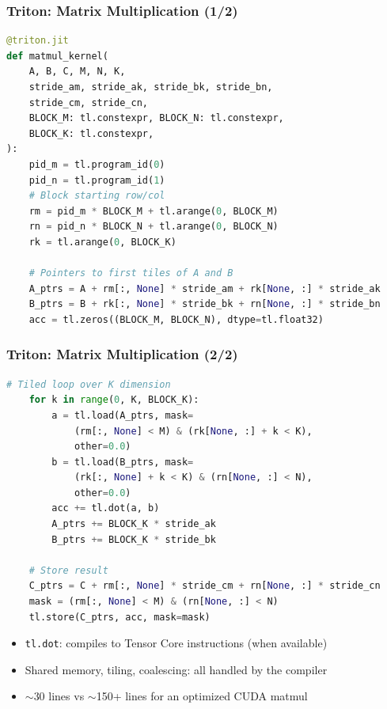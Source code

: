 \documentclass[aspectratio=169]{beamer}
\begin{document}
\begin{frame}[fragile]
	\frametitle{Triton: Matrix Multiplication (1/2)}
	\begin{lstlisting}[language=Python]
@triton.jit
def matmul_kernel(
    A, B, C, M, N, K,
    stride_am, stride_ak, stride_bk, stride_bn,
    stride_cm, stride_cn,
    BLOCK_M: tl.constexpr, BLOCK_N: tl.constexpr,
    BLOCK_K: tl.constexpr,
):
    pid_m = tl.program_id(0)
    pid_n = tl.program_id(1)
    # Block starting row/col
    rm = pid_m * BLOCK_M + tl.arange(0, BLOCK_M)
    rn = pid_n * BLOCK_N + tl.arange(0, BLOCK_N)
    rk = tl.arange(0, BLOCK_K)

    # Pointers to first tiles of A and B
    A_ptrs = A + rm[:, None] * stride_am + rk[None, :] * stride_ak
    B_ptrs = B + rk[:, None] * stride_bk + rn[None, :] * stride_bn
    acc = tl.zeros((BLOCK_M, BLOCK_N), dtype=tl.float32)
	\end{lstlisting}
\end{frame}

\begin{frame}[fragile]
	\frametitle{Triton: Matrix Multiplication (2/2)}
	\begin{lstlisting}[language=Python]
    # Tiled loop over K dimension
    for k in range(0, K, BLOCK_K):
        a = tl.load(A_ptrs, mask=
            (rm[:, None] < M) & (rk[None, :] + k < K),
            other=0.0)
        b = tl.load(B_ptrs, mask=
            (rk[:, None] + k < K) & (rn[None, :] < N),
            other=0.0)
        acc += tl.dot(a, b)
        A_ptrs += BLOCK_K * stride_ak
        B_ptrs += BLOCK_K * stride_bk

    # Store result
    C_ptrs = C + rm[:, None] * stride_cm + rn[None, :] * stride_cn
    mask = (rm[:, None] < M) & (rn[None, :] < N)
    tl.store(C_ptrs, acc, mask=mask)
	\end{lstlisting}
	\vspace{0.3em}
	\begin{itemize}
		\item \texttt{tl.dot}: compiles to Tensor Core instructions (when available)
		\item Shared memory, tiling, coalescing: all handled by the compiler
		\item $\sim$30 lines vs $\sim$150+ lines for an optimized CUDA matmul
	\end{itemize}
\end{frame}
\end{document}
